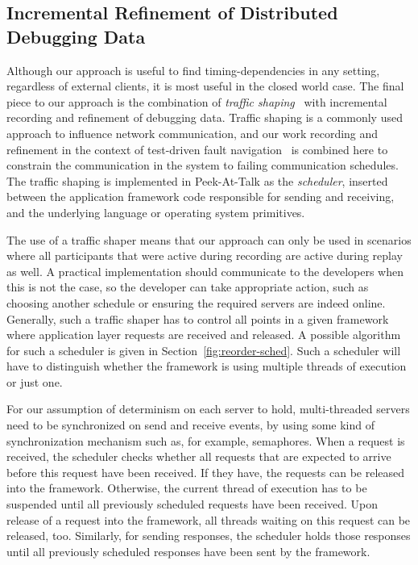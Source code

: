 \documentclass[preprint,3p]{elsarticle}
\newcommand{\toolname}{Peek-At-Talk\xspace}
\begin{document}
\subsection{Incremental Refinement of Distributed Debugging Data}

Although our approach is useful to find timing-dependencies in any setting,
regardless of external clients, it is most useful in the closed world case. The
final piece to our approach is the combination of \emph{traffic
  shaping}~\cite{IetfShaper} with incremental recording and refinement of
debugging data. Traffic shaping is a commonly used approach to influence network
communication, and our work recording and refinement in the context of
test-driven fault navigation~\cite{Perscheid} is combined here to constrain the
communication in the system to failing communication schedules. The traffic
shaping is implemented in \toolname as the \emph{scheduler}, inserted between
the application framework code responsible for sending and receiving, and the
underlying language or operating system primitives.

The use of a traffic shaper means that our approach can only be used in
scenarios where all participants that were active during recording are active
during replay as well. A practical implementation should communicate to the
developers when this is not the case, so the developer can take appropriate
action, such as choosing another schedule or ensuring the required servers are
indeed online. Generally, such a traffic shaper has to control all points in a
given framework where application layer requests are received and released. A
possible algorithm for such a scheduler is given in
Section~\ref{fig:reorder-sched}. Such a scheduler will have to distinguish whether
the framework is using multiple threads of execution or just one.

For our assumption of determinism on each server to hold, multi-threaded servers
need to be synchronized on send and receive events, by using some kind of
synchronization mechanism such as, for example, semaphores. When a request is
received, the scheduler checks whether all requests that are expected to arrive
before this request have been received. If they have, the requests can be
released into the framework. Otherwise, the current thread of execution has to
be suspended until all previously scheduled requests have been received. Upon
release of a request into the framework, all threads waiting on this request can
be released, too. Similarly, for sending responses, the scheduler holds those
responses until all previously scheduled responses have been sent by the
framework.
\end{document}
